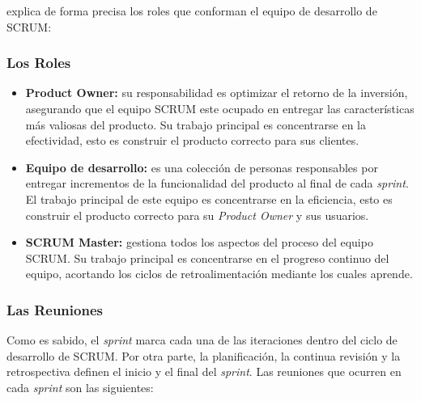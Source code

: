 \cite{Hundermark} explica de forma precisa los roles que conforman el equipo de desarrollo de SCRUM:

		\subsubsection{Los Roles}
			
			\begin{itemize}
				
				\item \textbf{Product Owner:} su responsabilidad es optimizar el retorno de la inversi\'{o}n, asegurando que el equipo SCRUM este ocupado en entregar las caracter\'{i}sticas m\'{a}s valiosas del producto. Su trabajo principal es concentrarse en la efectividad, esto es construir el producto correcto para sus clientes.
				
				\item \textbf{Equipo de desarrollo:} es una colecci\'{o}n de personas responsables por entregar incrementos de la funcionalidad del producto al final de cada \textit{sprint}. El trabajo principal de este equipo es concentrarse en la eficiencia, esto es construir el producto correcto para su \textit{Product Owner} y sus usuarios.
				
				\item \textbf{SCRUM Master:} gestiona todos los aspectos del proceso del equipo SCRUM. Su trabajo principal es concentrarse en el progreso continuo del equipo, acortando los ciclos de retroalimentaci\'{o}n mediante los cuales aprende.
				
			\end{itemize}
			
		\subsubsection{Las Reuniones}
			Como es sabido, el \textit{sprint} marca cada una de las iteraciones dentro del ciclo de desarrollo de SCRUM. Por otra parte, la planificaci\'{o}n, la continua revisi\'{o}n y la retrospectiva definen el inicio y el final del \textit{sprint}. Las reuniones que ocurren en cada \textit{sprint} son las siguientes:
			
